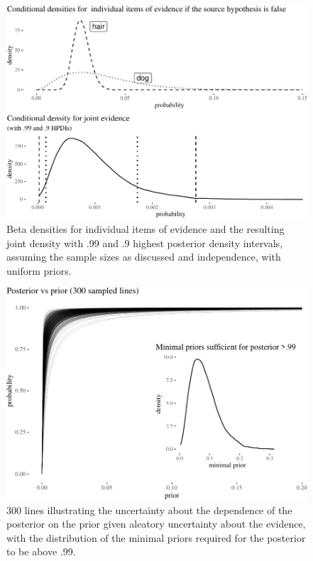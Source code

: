 \documentclass[
  10pt,
  dvipsnames,enabledeprecatedfontcommands]{scrartcl}
\begin{document}
\begin{figure}[H]

\begin{center}\includegraphics[width=0.8\linewidth]{imprecision_philosophical_paper2_files/figure-latex/Figdensities-1} \end{center}
\caption{Beta densities for individual items of evidence and the resulting joint density with .99 and .9 highest posterior density intervals, assuming the sample sizes as discussed and independence, with uniform priors.}
\label{Figdensities}
\end{figure}

\begin{figure}[H]

\begin{center}\includegraphics[width=0.6\linewidth]{imprecision_philosophical_paper2_files/figure-latex/Figlines5-1} \end{center}

\caption{300 lines illustrating the uncertainty about the dependence of the posterior on the prior given aleatory uncertainty about the evidence, with the distribution of the minimal priors required for the posterior to be above .99.}

\label{Figlines}

\end{figure}
\end{document}
